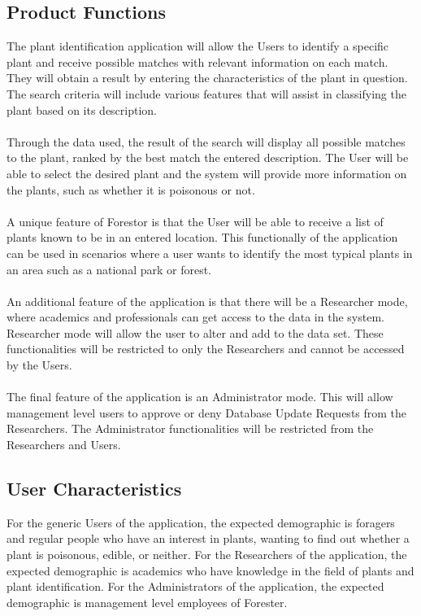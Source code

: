 \documentclass[]{article}
\begin{document}
\subsection{Product Functions}
\label{sub:product_functions}
The plant identification application will allow the Users to identify a specific plant and receive {\color{red}possible matches with relevant information on each match.} They will obtain a result by entering the characteristics of the plant in question. The search criteria will include various features that will assist in classifying the plant based on its description. \\ \\
Through the data used, the result of the search will display {\color{red} all possible matches to the plant, ranked by the best match the entered description.} The User will be able to select the desired plant and the system will provide more information on the plants, such as whether it is poisonous or not.  \\ \\
A unique feature of Forestor is that the User will be able to receive a list of plants known to be in an entered location. This functionally of the application can be used in scenarios where a user wants to identify the most typical plants in an area such as a national park or forest. \\ \\
{\color{red}
An additional feature of the application is that there will be a Researcher mode, where academics and professionals can get access to the data in the system. Researcher mode will allow the user to alter and add to the data set. These functionalities will be restricted to only the Researchers and cannot be accessed by the Users. \\ \\
The final feature of the application is an Administrator mode. This will allow management level users to approve or deny Database Update Requests from the Researchers. The Administrator functionalities will be restricted from the Researchers and Users.}


\subsection{User Characteristics}
\label{sub:user_characteristics}
{\color{red}
 For the generic Users of the application, the expected demographic is foragers and regular people who have an interest in plants, wanting to find out whether a plant is poisonous, edible, or neither. For the Researchers of the application, the  expected demographic is academics who have knowledge in the field of plants and plant identification. For the Administrators of the application, the expected demographic is management level employees of Forester.}
\end{document}
